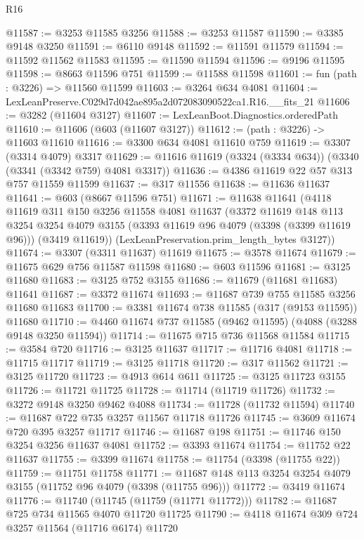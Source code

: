 \begin{lexlean}{R16}
\begin{coremodule}
@11587 := @3253 @11585 @3256
@11588 := @3253 @11587
@11590 := @3385 @9148 @3250
@11591 := @6110 @9148
@11592 := @11591 @11579
@11594 := @11592 @11562 @11583
@11595 := @11590 @11594
@11596 := @9196 @11595
@11598 := @8663 @11596 @751
@11599 := @11588 @11598
@11601 := fun (path : @3226) => @11560 @11599
@11603 := @3264 @634 @4081
@11604 := LexLeanPreserve.C029d7d042ae895a2d072083090522ca1.R16.__fits_21
@11606 := @3282 (@11604 @3127)
@11607 := LexLeanBoot.Diagnostics.orderedPath
@11610 := @11606 (@603 (@11607 @3127))
@11612 := (path : @3226) -> @11603 @11610
@11616 := @3300 @634 @4081 @11610 @759
@11619 := @3307 (@3314 @4079) @3317
@11629 := @11616 @11619 (@3324 (@3334 @634)) (@3340 (@3341 (@3342 @759) @4081 @3317))
@11636 := @4386 @11619 @22 @57 @313 @757 @11559 @11599
@11637 := @317 @11556
@11638 := @11636 @11637
@11641 := @603 (@8667 @11596 @751)
@11671 := @11638
    @11641
    (@4118
      @11619
      @311
      @150
      @3256
      @11558
      @4081
      @11637
      (@3372
        @11619
        @148
        @113
        @3254
        @3254
        @4079
        @3155
        (@3393 @11619 @96 @4079 (@3398 (@3399 @11619 @96)))
        (@3419 @11619))
      (LexLeanPreservation.prim_length_bytes @3127))
@11674 := @3307 (@3311 @11637) @11619
@11675 := @3578 @11674
@11679 := @11675 @629 @756 @11587 @11598
@11680 := @603 @11596
@11681 := @3125 @11680
@11683 := @3125 @752 @3155
@11686 := @11679 (@11681 @11683) @11641
@11687 := @3372 @11674
@11693 := @11687 @739 @755 @11585 @3256 @11680 @11683
@11700 := @3381 @11674 @738 @11585 (@317 (@9153 @11595)) @11680
@11710 := @4460 @11674 @737 @11585 (@9462 @11595) (@4088 (@3288 @9148 @3250 @11594))
@11714 := @11675 @715 @736 @11568 @11584
@11715 := @3584 @720
@11716 := @3125 @11637
@11717 := @11716 @4081
@11718 := @11715 @11717
@11719 := @3125 @11718
@11720 := @317 @11562
@11721 := @3125 @11720
@11723 := @4913 @614 @611
@11725 := @3125 @11723 @3155
@11726 := @11721 @11725
@11728 := @11714 (@11719 @11726)
@11732 := @3272 @9148 @3250 @9462 @4088
@11734 := @11728 (@11732 @11594)
@11740 := @11687 @722 @735 @3257 @11567 @11718 @11726
@11745 := @3609 @11674 @720 @395 @3257 @11717
@11746 := @11687 @198
@11751 := @11746 @150 @3254 @3256 @11637 @4081
@11752 := @3393 @11674
@11754 := @11752 @22 @11637
@11755 := @3399 @11674
@11758 := @11754 (@3398 (@11755 @22))
@11759 := @11751 @11758
@11771 := @11687 @148 @113 @3254 @3254 @4079 @3155 (@11752 @96 @4079 (@3398 (@11755 @96)))
@11772 := @3419 @11674
@11776 := @11740 (@11745 (@11759 (@11771 @11772)))
@11782 := @11687 @725 @734 @11565 @4070 @11720 @11725
@11790 := @4118 @11674 @309 @724 @3257 @11564 (@11716 @6174) @11720

\end{coremodule}
\end{lexlean}
